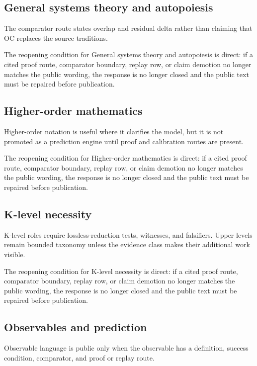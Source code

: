 \subsection{General systems theory and autopoiesis}

The comparator route states overlap and residual delta rather than claiming that OC replaces the source traditions.


The reopening condition for General systems theory and autopoiesis is direct: if a cited proof route, comparator boundary, replay row, or claim demotion no longer matches the public wording, the response is no longer closed and the public text must be repaired before publication.


\subsection{Higher-order mathematics}

Higher-order notation is useful where it clarifies the model, but it is not promoted as a prediction engine until proof and calibration routes are present.


The reopening condition for Higher-order mathematics is direct: if a cited proof route, comparator boundary, replay row, or claim demotion no longer matches the public wording, the response is no longer closed and the public text must be repaired before publication.


\subsection{K-level necessity}

K-level roles require lossless-reduction tests, witnesses, and falsifiers. Upper levels remain bounded taxonomy unless the evidence class makes their additional work visible.


The reopening condition for K-level necessity is direct: if a cited proof route, comparator boundary, replay row, or claim demotion no longer matches the public wording, the response is no longer closed and the public text must be repaired before publication.


\subsection{Observables and prediction}

Observable language is public only when the observable has a definition, success condition, comparator, and proof or replay route.


